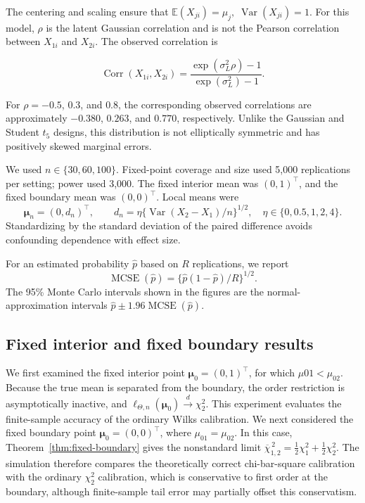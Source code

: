 \documentclass[11pt]{article}
\theoremstyle{remark}
\newcommand{\E}{\mathbb{E}}
\newcommand{\barchi}[2]{\overline{\chi}^{\,2}_{#1,#2}}
\begin{document}
The centering and scaling ensure that $
\E(X_{ji})=\mu_j,
\;
\operatorname{Var}(X_{ji})=1.
$ For this model, $\rho$ is the latent Gaussian correlation and is not the Pearson correlation between $X_{1i}$ and $X_{2i}$. The observed correlation is

$$
\operatorname{Corr}(X_{1i},X_{2i})
=
\frac{
\exp(\sigma_L^2\rho)-1
}{
\exp(\sigma_L^2)-1
}.
$$

For $\rho=-0.5$, $0.3$, and $0.8$, the corresponding observed correlations are approximately $-0.380$, $0.263$, and $0.770$, respectively. Unlike the Gaussian and Student $t_5$ designs, this distribution is not elliptically symmetric and has positively skewed marginal errors.





We used $n\in\{30,60,100\}$. Fixed-point coverage and size used 5,000 replications per setting; power used 3,000. The fixed interior mean was $(0,1)^\top$, and the fixed boundary mean was $(0,0)^\top$. Local means were
$$
  \boldsymbol{\mu}_n=(0,d_n)^\top,\qquad
  d_n=\eta\{\operatorname{Var}(X_2-X_1)/n\}^{1/2},
  \quad
  \eta\in\{0,0.5,1,2,4\}.
$$
Standardizing by the standard deviation of the paired difference avoids confounding dependence with effect size.

For an estimated probability $\widehat p$ based on $R$ replications, we report
$$
  \operatorname{MCSE}(\widehat p)
  =
  \{\widehat p(1-\widehat p)/R\}^{1/2}.
$$
The 95\% Monte Carlo intervals shown in the figures are the normal-approximation intervals $\widehat p\pm1.96\operatorname{MCSE}(\widehat p)$.

\subsection{Fixed interior and fixed boundary results}

We first examined the fixed interior point $\boldsymbol{\mu}_0=(0,1)^\top$, for which $\mu{01}<\mu_{02}$. Because the true mean is separated from the boundary, the order restriction is asymptotically inactive, and  $\ell_{\Theta,n}(\boldsymbol{\mu}_0)\overset{d}\longrightarrow\chi^2_2$. This experiment evaluates the finite-sample accuracy of the ordinary Wilks calibration. We next considered the fixed boundary point $\boldsymbol{\mu}_0=(0,0)^\top$, where $\mu_{01}=\mu_{02}$. In this case, Theorem~\ref{thm:fixed-boundary} gives the nonstandard limit $\barchi{1}{2}=\tfrac12\chi^2_1+\tfrac12\chi^2_2$. The simulation therefore compares the theoretically correct chi-bar-square calibration with the ordinary $\chi^2_2$ calibration, which is conservative to first order at the boundary, although finite-sample tail error may partially offset this conservatism.
\end{document}
